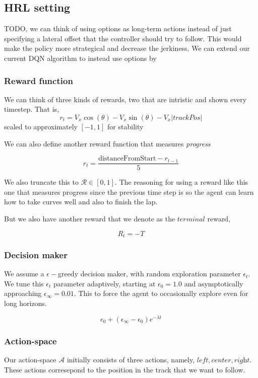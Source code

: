 \documentclass{article}
\begin{document}
\subsection{HRL setting}

TODO, we can think of using options as long-term actions instead of just specifying a lateral offset that the controller should try to follow. This would make the policy more strategical and decrease the jerkiness.
We can extend our current DQN algorithm to instead use options by

\subsubsection{Reward function}

We can think of three kinds of rewards, two that are intristic and shown every timestep. That is,  
\[
r_t = V_x \cos(\theta) - V_x\sin(\theta)-V_x|trackPos|
\]
scaled to approximately $[-1,1]$ for stability

We can also define another reward function that measures \textit{progress}

\[
r_t = \frac{\text{distanceFromStart} - r_{t-1}}{5}
\]

We also truncate this to $\mathcal{R} \in [0, 1]$. The reasoning for using a reward like this one that measures progress since the previous time step is so the agent can learn how to take curves well and also to finish the lap.

But we also have another reward that we denote as the $\textit{terminal}$ reward,

\[
R_t = -T
\]



\subsubsection{Decision maker}
We assume a $\epsilon-$greedy decision maker, with random exploration parameter $\epsilon_t$. We tune this $\epsilon_t$ parameter adaptively, starting at $\epsilon_0 = 1.0$ and asymptotically approaching $\epsilon_\infty = 0.01$. This to force the agent to occasionally explore even for long horizons.

\[
	\epsilon_0 + (\epsilon_\infty - \epsilon_0) e^{-\lambda t}
\]

\subsubsection{Action-space}
Our action-space $\mathcal{A}$ initially consists of three actions, namely, $\textit{left}, \textit{center}, \textit{right}$. These actions corresepond to the position in the track that we want to follow. 
\end{document}
